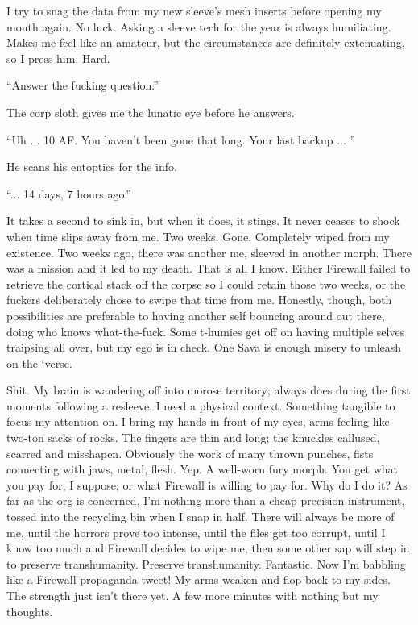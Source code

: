 I try to snag the data from my new sleeve's mesh inserts before opening my mouth again. No luck. Asking a sleeve tech for the year is always humiliating. Makes me feel like an amateur, but the circumstances are definitely extenuating, so I press him. Hard. 

``Answer the fucking question.'' 

The corp sloth gives me the lunatic eye before he answers. 

``Uh ... 10 AF. You haven't been gone that long. Your last backup ... '' 

He scans his entoptics for the info. 

``... 14 days, 7 hours ago.'' 

It takes a second to sink in, but when it does, it stings. It never ceases to shock when time slips away from me. Two weeks. Gone. Completely wiped from my existence. Two weeks ago, there was another me, sleeved in another morph. There was a mission and it led to my death. That is all I know. Either Firewall failed to retrieve the cortical stack off the corpse so I could retain those two weeks, or the fuckers deliberately chose to swipe that time from me. Honestly, though, both possibilities are preferable to having another self bouncing around out there, doing who knows what-the-fuck. Some t-humies get off on having multiple selves traipsing all over, but my ego is in check. One Sava is enough misery to unleash on the ‘verse. 

Shit. My brain is wandering off into morose territory; always does during the first moments following a resleeve. I need a physical context. Something tangible to focus my attention on. I bring my hands in front of my eyes, arms feeling like two-ton sacks of rocks. The fingers are thin and long; the knuckles callused, scarred and misshapen. Obviously the work of many thrown punches, fists connecting with jaws, metal, flesh. Yep. A well-worn fury morph. You get what you pay for, I suppose; or what Firewall is willing to pay for. Why do I do it? As far as the org is concerned, I'm nothing more than a cheap precision instrument, tossed into the recycling bin when I snap in half. There will always be more of me, until the horrors prove too intense, until the files get too corrupt, until I know too much and Firewall decides to wipe me, then some other sap will step in to preserve transhumanity. Preserve transhumanity. Fantastic. Now I'm babbling like a Firewall propaganda tweet! My arms weaken and flop back to my sides. The strength just isn't there yet. A few more minutes with nothing but my thoughts. 

